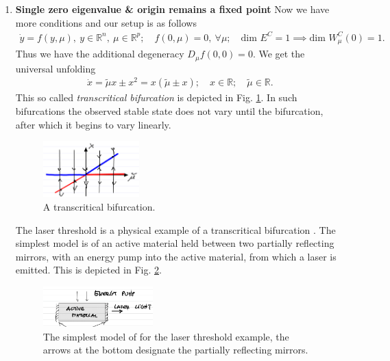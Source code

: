 \begin{enumerate}
	\item \textbf{Single zero eigenvalue \& origin remains a fixed point} 	
		Now we have more conditions and our setup is as follows
		\begin{align}
			\dot{y} = f(y, \mu),\ y \in \mathbb{R}^{n},\ \mu\in \mathbb{R}^{p};\quad f(0,\mu )=0,\ \forall \mu ;\quad  \textrm{dim }E^{C}=1\implies  \textrm{dim } W^{C}_{\mu }(0)=1.  
		\end{align}
		Thus we have the additional degeneracy $D_{\mu }f(0,0)=0$. We get the universal unfolding 
		\begin{align}
			\dot{x} = \tilde{\mu }x \pm x^2 = x (\tilde{\mu } \pm x);\quad x \in \mathbb{R};\quad \tilde{\mu} \in \mathbb{R}.	
		\end{align}
		This so called \emph{transcritical bifurcation} is depicted in Fig. \ref{fig:transcrit_bif}. In such bifurcations the observed stable state does not vary until the bifurcation, after which it begins to vary linearly.
		\begin{figure}[h!]
			\centering
			\includegraphics[width=0.35\textwidth]{figures/ch3/15transcrit_bif.png}
			\caption{A transcritical bifurcation.}
			\label{fig:transcrit_bif}
		\end{figure}
	\begin{ex}
		The laser threshold is a physical example of a transcritical bifurcation \cite{Strogatz, Haken1977}. The simplest model is of an active material held between two partially reflecting mirrors, with an energy pump into the active material, from which a laser is emitted. This is depicted in Fig. \ref{fig:laser_model}.
		\begin{figure}[h!]
			\centering
			\includegraphics[width=0.4\textwidth]{figures/ch3/15laser_threshold.png}
			\caption{The simplest model of for the laser threshold example, the arrows at the bottom designate the partially reflecting mirrors.}
			\label{fig:laser_model}
		\end{figure}
	

\end{ex}
\end{enumerate}
